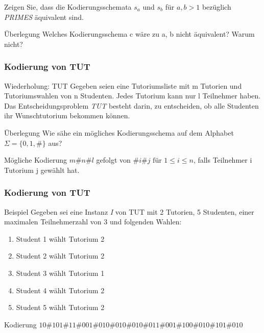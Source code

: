 \documentclass{beamer}
\begin{document}
{\begin{frame}
Zeigen Sie, dass die Kodierungsschemata $s_a$ und $s_b$ für $a,b>1$ bezüglich \textit{PRIMES} äquivalent sind.

\begin{block}{Überlegung}
 Welches Kodierungsschema c wäre zu a, b nicht äquivalent? Warum nicht?
\end{block}
\end{frame}

\begin{frame}
\frametitle{Kodierung von TUT}
 \begin{block}{Wiederholung: TUT}
  Gegeben seien eine Tutoriumsliste mit m Tutorien und Tutoriumswahlen von n Studenten. Jedes Tutorium kann nur l Teilnehmer haben.
 Das Entscheidungsproblem \textit{TUT} besteht darin, zu entscheiden, ob alle Studenten ihr Wunschtutorium bekommen können.
 \end{block}
 \begin{block}{Überlegung}
 Wie sähe ein mögliches Kodierungsschema auf dem Alphabet $\Sigma = \{0,1,\#\}$ aus?
 \end{block}
 \pause
 \begin{block}{Mögliche Kodierung}
 $m\#n\#l$ gefolgt von $\#i\#j \mbox{ für } 1 \leq i \leq n$, falls Teilnehmer i Tutorium j gewählt hat.
 \end{block}
\end{frame}

\begin{frame}
\frametitle{Kodierung von TUT}
\begin{block}{Beispiel}
 Gegeben sei eine Instanz \textit{I} von TUT mit 2 Tutorien, 5 Studenten, einer maximalen Teilnehmerzahl von 3 und folgenden Wahlen:
 \begin{enumerate}
  \item Student 1 wählt Tutorium 2
  \item Student 2 wählt Tutorium 2
  \item Student 3 wählt Tutorium 1
  \item Student 4 wählt Tutorium 2
  \item Student 5 wählt Tutorium 2
 \end{enumerate}
\end{block}
\pause
\begin{block}{Kodierung}
$10\#101\#11 \#001\#010 \#010\#010 \#011\#001 \#100\#010 \#101\#010$
\end{block}
\end{frame}

}
\end{document}
